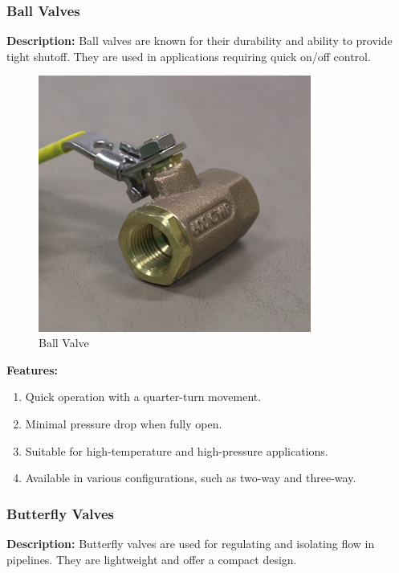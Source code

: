 \subsubsection{Ball Valves}

\textbf{Description:} Ball valves are known for their durability and ability to provide tight shutoff. They are used in applications requiring quick on/off control.

\begin{figure}[h]
    \centering
    \includegraphics[width=0.8\textwidth,height=0.33\textheight,keepaspectratio]{figs/valves/ball.png}
    \caption{Ball Valve}
    \label{fig:ball_valve}
\end{figure}

\textbf{Features:}
\begin{enumerate}
    \item Quick operation with a quarter-turn movement.
    \item Minimal pressure drop when fully open.
    \item Suitable for high-temperature and high-pressure applications.
    \item Available in various configurations, such as two-way and three-way.
\end{enumerate}
\subsubsection{Butterfly Valves}

\textbf{Description:} Butterfly valves are used for regulating and isolating flow in pipelines. They are lightweight and offer a compact design.

